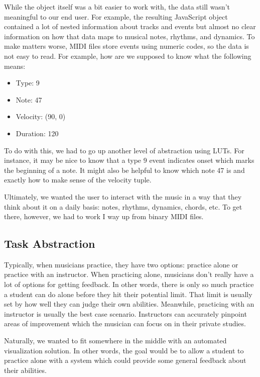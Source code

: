 \documentclass[journal]{vgtc}                %
\begin{document}
While the object itself was a bit easier to work with, the data still wasn't
meaningful to our end user. For example, the resulting JavaScript object
contained a lot of nested information about tracks and events but almost no
clear information on how that data maps to musical notes, rhythms, and dynamics.
To make matters worse, MIDI files store events using numeric codes, so the
data is not easy to read. For example, how are we supposed to know what
the following means:

\begin{itemize}
  \item Type: 9
  \item Note: 47
  \item Velocity: (90, 0)
  \item Duration: 120
\end{itemize}

To do with this, we had to go up another level of abstraction using LUTs.
For instance, it may be nice to know that a type 9 event indicates onset which
marks the beginning of a note. It might also be helpful to know which note 47
is and exactly how to make sense of the velocity tuple.

Ultimately, we wanted the user to interact with the music in a way that they
think about it on a daily basis: notes, rhythms, dynamics, chords, etc. To get
there, however, we had to work I way up from binary MIDI files.

\subsection{Task Abstraction}

Typically, when musicians practice, they have two options: practice alone or
practice with an instructor. When practicing alone, musicians don't really have
a lot of options for getting feedback. In other words, there is only so much
practice a student can do alone before they hit their potential limit. That
limit is usually set by how well they can judge their own abilities. Meanwhile,
practicing with an instructor is usually the best case scenario. Instructors can
accurately pinpoint areas of improvement which the musician can focus on in their
private studies.

Naturally, we wanted to fit somewhere in the middle with an automated
visualization solution. In other words, the goal would be to allow a student to
practice alone with a system which could provide some general feedback about their
abilities.
\end{document}
